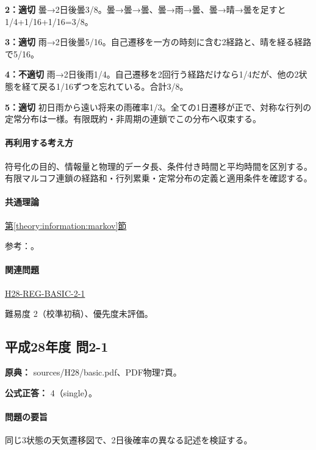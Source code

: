 \noindent\textbf{2：適切} 曇→2日後曇3/8。曇→曇→曇、曇→雨→曇、曇→晴→曇を足すと1/4+1/16+1/16=\allowbreak{}3/8。\par

\noindent\textbf{3：適切} 雨→2日後曇5/16。自己遷移を一方の時刻に含む2経路と、晴を経る経路で5/16。\par

\noindent\textbf{4：不適切} 雨→2日後雨1/4。自己遷移を2回行う経路だけなら1/4だが、他の2状態を経て戻る1/16ずつを忘れている。合計3/8。\par

\noindent\textbf{5：適切} 初日雨から遠い将来の雨確率1/3。全ての1日遷移が正で、対称な行列の定常分布は一様。有限既約・非周期の連鎖でこの分布へ収束する。\par

\paragraph{再利用する考え方} 符号化の目的、情報量と物理的データ長、条件付き時間と平均時間を区別する。有限マルコフ連鎖の経路和・行列累乗・定常分布の定義と適用条件を確認する。

\paragraph{共通理論} \hyperref[theory:information:markov]{第\ref*{theory:information:markov}節}

\par 参考：\cite{info_markov}。

\paragraph{関連問題} \hyperref[q:h28-reg-basic-2-1]{H28-REG-BASIC-2-1}

\par 難易度 2（校準初稿）、優先度未評価。

\subsection{平成28年度 問2-1}
\label{q:h28-reg-basic-2-1}

\noindent\textbf{原典：} sources/H28/basic.pdf、PDF物理7頁。

\textbf{公式正答：} 4（single）。

\paragraph{問題の要旨} 同じ3状態の天気遷移図で、2日後確率の異なる記述を検証する。

